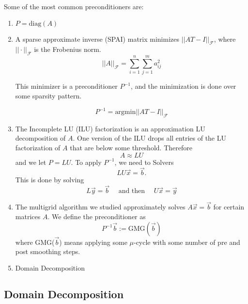 Some of the most common preconditioners are:
\begin{enumerate}[1)]
    \item $P = \text{diag}(A)$
    \item A sparse approximate inverse (SPAI) matrix minimizes $||AT-I||_{\mathcal{F}}$, where $||\cdot||_{\mathcal{F}}$ is the Frobenius norm.
    \begin{equation*}
        ||A||_{\mathcal{F}} = \sum_{i=1}^{n}\sum_{j=1}^{m}a_{ij}^2
    \end{equation*}

This minimizer is a preconditioner $P^{-1}$, and the minimization is done over some sparsity pattern.

\begin{equation*}
    P^{-1} = \text{argmin}||AT-I||_{\mathcal{F}}
\end{equation*}

\item The Incomplete LU (ILU) factorization is an approximation LU decomposition of $A$. One version of the ILU drops all entries of the LU factorization of $A$ that are below some threshold. Therefore
\begin{equation*}
    A \approx LU
\end{equation*}
and we let $P=LU$. To apply $P^{-1}$, we need to Solvers
\begin{equation*}
    LU \vec{x} = \vec{b}.
\end{equation*}
This is done by solving
\begin{equation*}
    L\vec{y}=\vec{b} \quad \text{ and then } \quad U\vec{x} = \vec{y}
\end{equation*}
\item The multigrid algorithm we studied approximately solves $A\vec{x} = \vec{b}$ for certain matrices $A$.
We define the preconditioner as
\begin{equation*}
    P^{-1}\vec{b} := \text{GMG}(\vec{b})
\end{equation*}
where GMG($\vec{b}$) means applying some $\mu$-cycle with
some number of pre and post smoothing steps.

\item Domain Decomposition

\end{enumerate}

\subsection{Domain Decomposition}

